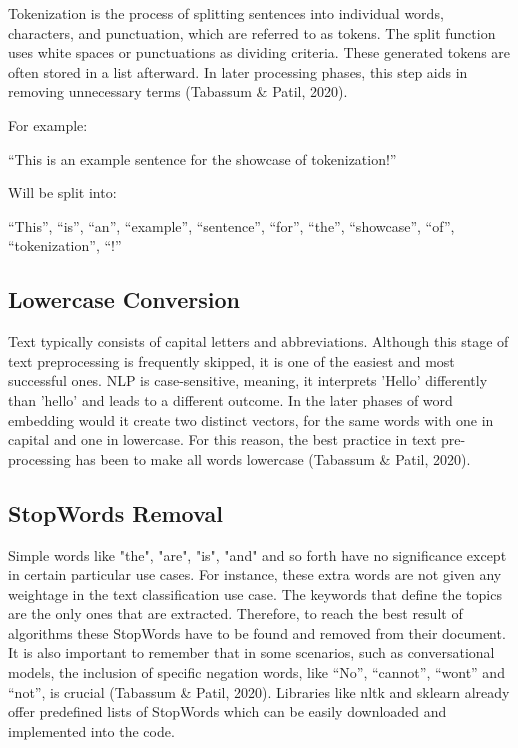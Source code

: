 Tokenization is the process of splitting sentences into individual words, characters, and punctuation, which are referred to as tokens. The split function uses white spaces or punctuations as dividing criteria. These generated tokens are often stored in a list afterward. In later processing phases, this step aids in removing unnecessary terms (Tabassum \& Patil, 2020). 

For example:

“This is an example sentence for the showcase of tokenization!”

Will be split into:

“This”, “is”, “an”, “example”, “sentence”, “for”, “the”, “showcase”, “of”, “tokenization”, “!”

\subsection{Lowercase Conversion}

Text typically consists of capital letters and abbreviations. Although this stage of text preprocessing is frequently skipped, it is one of the easiest and most successful ones. NLP is case-sensitive, meaning, it interprets 'Hello' differently than 'hello' and leads to a different outcome. In the later phases of word embedding would it create two distinct vectors, for the same words with one in capital and one in lowercase. For this reason, the best practice in text pre-processing has been to make all words lowercase (Tabassum \& Patil, 2020).

\subsection{StopWords Removal}

Simple words like "the", "are", "is", "and" and so forth have no significance except in certain particular use cases. For instance, these extra words are not given any weightage in the text classification use case. The keywords that define the topics are the only ones that are extracted. Therefore, to reach the best result of algorithms these StopWords have to be found and removed from their document. It is also important to remember that in some scenarios, such as conversational models, the inclusion of specific negation words, like “No”, “cannot”, “wont” and “not”, is crucial (Tabassum \& Patil, 2020). Libraries like nltk and sklearn already offer predefined lists of StopWords which can be easily downloaded and implemented into the code.

